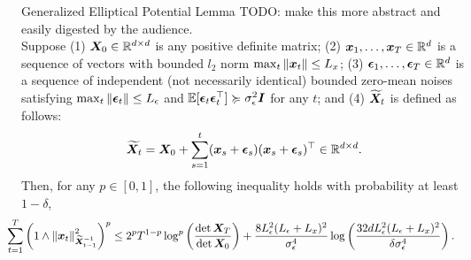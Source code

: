 \documentclass[10pt, xcolor={dvipsnames,x11names},compress]{beamer}
\begin{document}
\begin{frame}{Generalized Elliptical Potential Lemma}
TODO: make this more abstract and easily digested by the audience.\\
Suppose (1) ${\bm{X}}_0 \in \mathbb{R}^{d \times d}$ is any positive definite matrix; (2) ${\bm{x}}_1, \ldots, {\bm{x}}_T \in \mathbb{R}^d$ is a sequence of vectors with bounded $l_2$ norm $\max_t \|{\bm{x}}_t\| \leq L_x$; (3) ${\bm{\epsilon}}_1, \ldots, {\bm{\epsilon}}_T \in \mathbb{R}^d$ is a sequence of independent (not necessarily identical) bounded zero-mean   noises satisfying  $\max_{t} \|{\bm{\epsilon}}_t\| \leq L_{\epsilon}$ and $   \mathbb{E}[{\bm{\epsilon}}_t {\bm{\epsilon}}_t^\top] \succcurlyeq \sigma^2_{\epsilon} {\bm{I}}$ for any $t$; %
and (4) $\widetilde{{\bm{X}}}_t$ is defined as follows:
\begin{equation*}\label{eq:data-matrix-GEPL}
    \widetilde{{\bm{X}}}_t={\bm{X}}_0+\sum_{s=1}^t  ({\bm{x}}_s + {\bm{\epsilon}}_s)  ({\bm{x}}_s + {\bm{\epsilon}}_s)^{\top} \in \mathbb{R}^{d \times d}. 
\end{equation*} 
Then, for any $p \in [0, 1]$, the following inequality holds with probability at least $1-\delta$,
{\scriptsize
\begin{align}\label{eq:gepl-bound}
    \!\!\!\!\!\!\!\!\sum_{t=1}^T\left(1 \wedge\left\| \vx_t \right\|_{\widetilde{\mX}_{t-1}^{-1}}^2\right)^p &\leq  2^p T^{1-p}\log^p\left(\frac{\det \mX_T}{\det\mX_0}\right) +  \frac{  8 L_\epsilon^2 (L_\epsilon + L_x)^2 }{\sigma_{\epsilon}^4} \log\left(\frac{32d L_\epsilon^2 (L_\epsilon + L_x)^2 }{\delta \sigma_{\epsilon}^4}\right).  \nonumber
\end{align}}


\end{frame}
\end{document}
